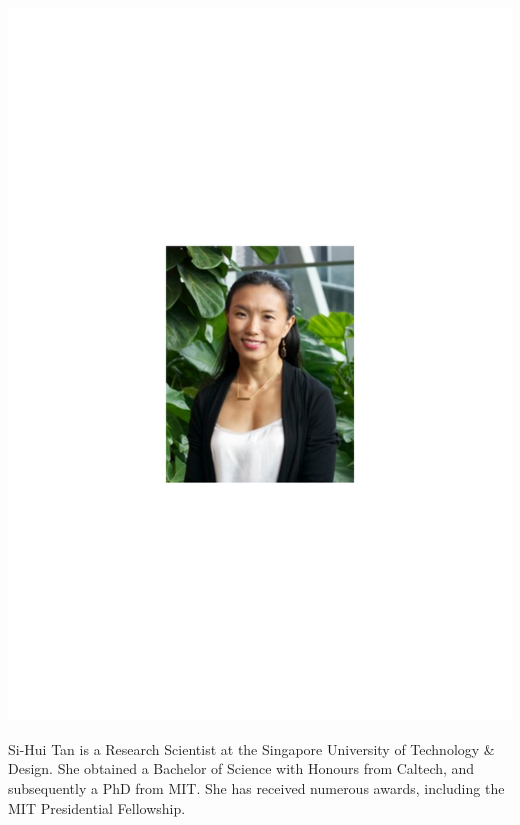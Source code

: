 \includegraphics[width=\columnwidth]{photo_sihui_tan}

Si-Hui Tan is a Research Scientist at the Singapore University of Technology \& Design. She obtained a Bachelor of Science with Honours from Caltech, and subsequently a PhD from MIT. She has received numerous awards, including the MIT Presidential Fellowship.


